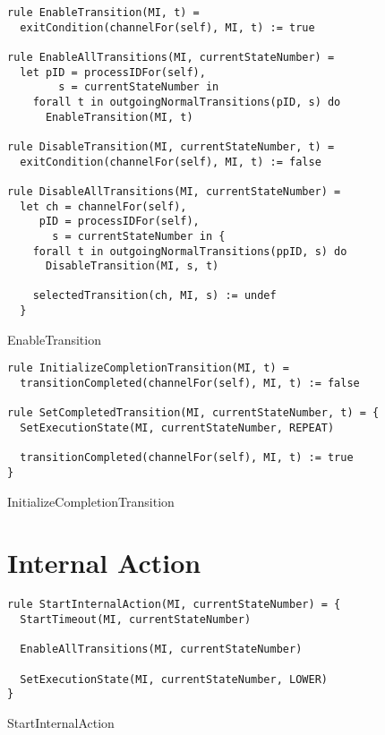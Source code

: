 \begin{listing}[H]
\begin{verbatim}
rule EnableTransition(MI, t) =
  exitCondition(channelFor(self), MI, t) := true

rule EnableAllTransitions(MI, currentStateNumber) =
  let pID = processIDFor(self),
        s = currentStateNumber in
    forall t in outgoingNormalTransitions(pID, s) do
      EnableTransition(MI, t)

rule DisableTransition(MI, currentStateNumber, t) =
  exitCondition(channelFor(self), MI, t) := false

rule DisableAllTransitions(MI, currentStateNumber) =
  let ch = channelFor(self),
     pID = processIDFor(self),
       s = currentStateNumber in {
    forall t in outgoingNormalTransitions(ppID, s) do
      DisableTransition(MI, s, t)

    selectedTransition(ch, MI, s) := undef
  }
\end{verbatim}
\caption{EnableTransition}
\label{lst:asm:EnableTransition}
\end{listing}


\begin{listing}[H]
\begin{verbatim}
rule InitializeCompletionTransition(MI, t) =
  transitionCompleted(channelFor(self), MI, t) := false

rule SetCompletedTransition(MI, currentStateNumber, t) = {
  SetExecutionState(MI, currentStateNumber, REPEAT)

  transitionCompleted(channelFor(self), MI, t) := true
}
\end{verbatim}
\caption{InitializeCompletionTransition}
\label{lst:asm:InitializeCompletionTransition}
\end{listing}



\section{Internal Action}


\begin{listing}[H]
\begin{verbatim}
rule StartInternalAction(MI, currentStateNumber) = {
  StartTimeout(MI, currentStateNumber)

  EnableAllTransitions(MI, currentStateNumber)

  SetExecutionState(MI, currentStateNumber, LOWER)
}
\end{verbatim}
\caption{StartInternalAction}
\label{lst:asm:StartInternalAction}
\end{listing}




